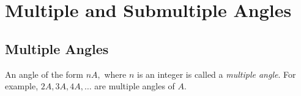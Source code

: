 \chapter{Multiple and Submultiple Angles}
\section{Multiple Angles}
An angle of the form $nA,$ where $n$ is an integer is called a \textit{multiple angle}. For example, $2A, 3A, 4A,
\ldots$ are multiple angles of $A.$
